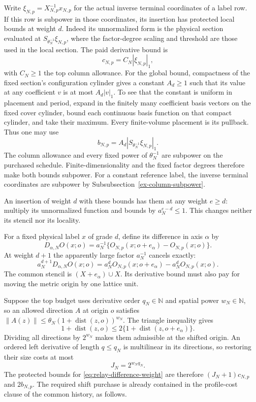 Write $\xi_{N,p}=X_{N,p}^{-1}x_{N,p}$ for the actual inverse terminal
coordinates of a label row. If this row is subpower in those coordinates,
its insertion has protected local bounds at weight $d$. Indeed its
unnormalized form is the physical section evaluated at
$S_{\theta_N^{-1}}\xi_{N,p}$, where the factor-degree scaling and
threshold are those used in the local section. The paid derivative bound
is
\[
             c_{N,p}=C_N|\xi_{N,p}|_1,
\]
with $C_N\ge1$ the top column allowance. For the global bound, compactness
of the fixed section's configuration cylinder gives a constant $A_d\ge1$
such that its value at any coefficient $v$ is at most $A_d|v|_1$.
To see that the constant is uniform in placement and period, expand in
the finitely many coefficient basis vectors on the fixed cover cylinder,
bound each continuous basis function on that compact cylinder, and take
their maximum. Every finite-volume placement is its pullback.
Thus one may use
\[
             b_{N,p}=A_d|S_{\theta_N^{-1}}\xi_{N,p}|_1.
\]
The column allowance and every fixed power of $\theta_N^{-1}$ are
subpower on the purchased schedule. Finite-dimensionality and the fixed
factor degrees therefore make both bounds subpower. For a constant
reference label, the inverse terminal coordinates are subpower by
Subsubsection~\ref{ex-column-subpower}.

An insertion of weight $d$ with these bounds has them at any weight
$e\ge d$: multiply its unnormalized function and bounds by
$a_N^{e-d}\le1$. This changes neither its stencil nor its locality.

For a fixed physical label $x$ of grade $d$, define its difference in
axis $\alpha$ by
\[
 D_{\alpha,N}O(x;o)=a_N^{-1}
             \{O_{N,p}(x;o+e_\alpha)-O_{N,p}(x;o)\}.
\]
At weight $d+1$ the apparently large factor $a_N^{-1}$ cancels exactly:
\begin{equation}\label{eq:relay-difference-weight}
 a_N^{d+1}D_{\alpha,N}O(x;o)
       =a_N^dO_{N,p}(x;o+e_\alpha)-a_N^dO_{N,p}(x;o).
\end{equation}
The common stencil is $(X+e_\alpha)\cup X$. Its derivative bound must
also pay for moving the metric origin by one lattice unit.

Suppose the top budget uses derivative order $q_N\in\mathbb N$ and spatial power
$w_N\in\mathbb N$, so an allowed direction $A$ at origin $o$ satisfies
$\|A(z)\|\le\theta_N(1+\operatorname{dist}(z,o))^{w_N}$.
The triangle inequality gives
\[
 1+\operatorname{dist}(z,o)
        \le2\{1+\operatorname{dist}(z,o+e_\alpha)\}.
\]
Dividing all directions by $2^{w_N}$ makes them admissible at the
shifted origin. An ordered left derivative of length $q\le q_N$ is
multilinear in its directions, so restoring their size costs at most
\[
                         J_N=2^{w_Nq_N}.
\]
The protected bounds for \eqref{eq:relay-difference-weight} are therefore
$(J_N+1)c_{N,p}$ and $2b_{N,p}$. The required shift purchase is
already contained in the profile-cost clause of the common history, as
follows.

